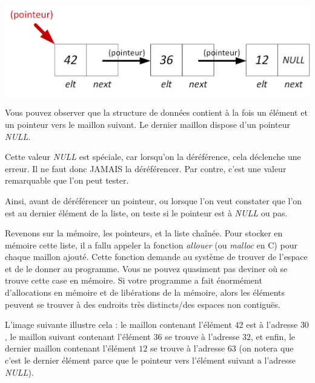 \documentclass[11pt,a4paper]{article}
\begin{document}
\begin{center}
\includegraphics[scale=0.75]{img/pointeurs/pointeurs1.png}
\end{center}

Vous pouvez observer que la structure de données contient à la fois un élément et un pointeur vers le maillon suivant.
Le dernier maillon dispose d'un pointeur \textit{NULL}.

Cette valeur \textit{NULL} est spéciale, car lorsqu'on la déréférence, cela déclenche une erreur.
Il ne faut donc JAMAIS la déréférencer.
Par contre, c'est une valeur remarquable que l'on peut tester.

Ainsi, avant de déréférencer un pointeur, ou lorsque l'on veut constater que l'on est au dernier élément de la liste, on teste si le pointeur est à \textit{NULL} ou pas.

\medskip

Revenons sur la mémoire, les pointeurs, et la liste chaînée.
Pour stocker en mémoire cette liste, il a fallu appeler la fonction \textit{allouer} (ou \textit{malloc} en C) pour chaque maillon ajouté.
Cette fonction demande au système de trouver de l'espace et de le donner au programme.
Vous ne pouvez quasiment pas deviner où se trouve cette case en mémoire.
Si votre programme a fait énormément d'allocations en mémoire et de libérations de la mémoire, alors les éléments peuvent se trouver à des endroits très distincts/des espaces non contiguës.

L'image suivante illustre cela : le maillon contenant l'élément $ 42 $ est à l'adresse $ 30 $, le maillon suivant contenant l'élément $ 36 $ se trouve à l'adresse $ 32 $, et enfin, le dernier maillon contenant l'élément $ 12 $ se trouve à l'adresse 63 (on notera que c'est le dernier élément parce que le pointeur vers l'élément suivant a l'adresse \textit{NULL}).
\end{document}
